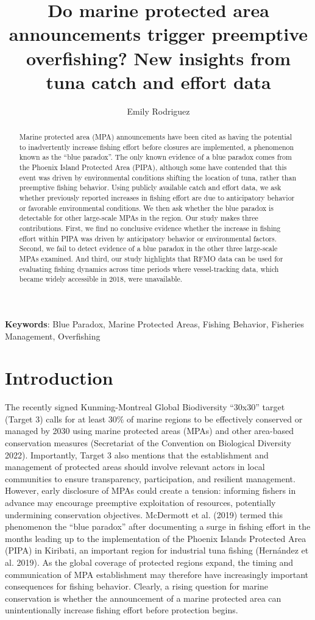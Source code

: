 \documentclass[
  letterpaper,
  DIV=11,
  numbers=noendperiod]{scrartcl}
\title{Do marine protected area announcements trigger preemptive
overfishing? New insights from tuna catch and effort data}
\author{Emily Rodriguez}
\date{}
\begin{document}
\maketitle
\begin{abstract}
Marine protected area (MPA) announcements have been cited as having the
potential to inadvertently increase fishing effort before closures are
implemented, a phenomenon known as the ``blue paradox''. The only known
evidence of a blue paradox comes from the Phoenix Island Protected Area
(PIPA), although some have contended that this event was driven by
environmental conditions shifting the location of tuna, rather than
preemptive fishing behavior. Using publicly available catch and effort
data, we ask whether previously reported increases in fishing effort are
due to anticipatory behavior or favorable environmental conditions. We
then ask whether the blue paradox is detectable for other large-scale
MPAs in the region. Our study makes three contributions. First, we find
no conclusive evidence whether the increase in fishing effort within
PIPA was driven by anticipatory behavior or environmental factors.
Second, we fail to detect evidence of a blue paradox in the other three
large-scale MPAs examined. And third, our study highlights that RFMO
data can be used for evaluating fishing dynamics across time periods
where vessel-tracking data, which became widely accessible in 2018, were
unavailable.
\end{abstract}


\textbf{Keywords}: Blue Paradox, Marine Protected Areas, Fishing
Behavior, Fisheries Management, Overfishing

\section{Introduction}\label{introduction}

The recently signed Kunming-Montreal Global Biodiversity ``30x30''
target (Target 3) calls for at least 30\% of marine regions to be
effectively conserved or managed by 2030 using marine protected areas
(MPAs) and other area-based conservation measures (Secretariat of the
Convention on Biological Diversity 2022). Importantly, Target 3 also
mentions that the establishment and management of protected areas should
involve relevant actors in local communities to ensure transparency,
participation, and resilient management. However, early disclosure of
MPAs could create a tension: informing fishers in advance may encourage
preemptive exploitation of resources, potentially undermining
conservation objectives. McDermott et al. (2019) termed this phenomenon
the ``blue paradox'' after documenting a surge in fishing effort in the
months leading up to the implementation of the Phoenix Islands Protected
Area (PIPA) in Kiribati, an important region for industrial tuna fishing
(Hernández et al. 2019). As the global coverage of protected regions
expand, the timing and communication of MPA establishment may therefore
have increasingly important consequences for fishing behavior. Clearly,
a rising question for marine conservation is whether the announcement of
a marine protected area can unintentionally increase fishing effort
before protection begins.
\end{document}
